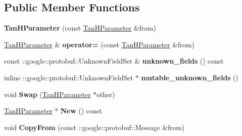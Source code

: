 \subsection*{Public Member Functions}
\begin{DoxyCompactItemize}
\item 
\mbox{\label{classcaffe_1_1_tan_h_parameter_aeef266a9d05df91f0a0f78c67f07ece5}} 
{\bfseries Tan\+H\+Parameter} (const \mbox{\hyperlink{classcaffe_1_1_tan_h_parameter}{Tan\+H\+Parameter}} \&from)
\item 
\mbox{\label{classcaffe_1_1_tan_h_parameter_a26cc779b72eedb127beb614e18e68f9b}} 
\mbox{\hyperlink{classcaffe_1_1_tan_h_parameter}{Tan\+H\+Parameter}} \& {\bfseries operator=} (const \mbox{\hyperlink{classcaffe_1_1_tan_h_parameter}{Tan\+H\+Parameter}} \&from)
\item 
\mbox{\label{classcaffe_1_1_tan_h_parameter_aeb8654d5d1fe6ef23cb032480d7891fb}} 
const \+::google\+::protobuf\+::\+Unknown\+Field\+Set \& {\bfseries unknown\+\_\+fields} () const
\item 
\mbox{\label{classcaffe_1_1_tan_h_parameter_a8a97507944aa4733d64a876bc9622263}} 
inline \+::google\+::protobuf\+::\+Unknown\+Field\+Set $\ast$ {\bfseries mutable\+\_\+unknown\+\_\+fields} ()
\item 
\mbox{\label{classcaffe_1_1_tan_h_parameter_a0d029e1798c0d9110432cf7adac47324}} 
void {\bfseries Swap} (\mbox{\hyperlink{classcaffe_1_1_tan_h_parameter}{Tan\+H\+Parameter}} $\ast$other)
\item 
\mbox{\label{classcaffe_1_1_tan_h_parameter_a5ad19313f1b1de94172ea86b1c341209}} 
\mbox{\hyperlink{classcaffe_1_1_tan_h_parameter}{Tan\+H\+Parameter}} $\ast$ {\bfseries New} () const
\item 
\mbox{\label{classcaffe_1_1_tan_h_parameter_a6291e8a6f3d5a059cf443338ee20f477}} 
void {\bfseries Copy\+From} (const \+::google\+::protobuf\+::\+Message \&from)
\item 
\mbox{\label{classcaffe_1_1_tan_h_parameter_a9dbf45013827869ead76b3f1afff59f8}} 

\end{DoxyCompactItemize}
